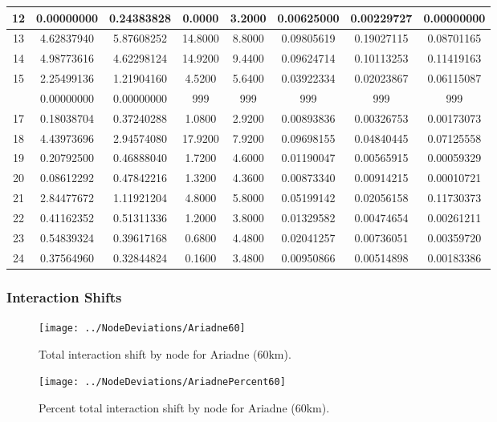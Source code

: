\documentclass[12pt,a4paper]{thesis}
\begin{document}
\begin{table}[H]
\begin{tabular}{|c|c|c|c|c|c|c|c|}
\hline	12	&	0.00000000	&	0.24383828	&	0.0000	&	3.2000	&	0.00625000	&	0.00229727	&	0.00000000	\\
\hline	13	&	4.62837940	&	5.87608252	&	14.8000	&	8.8000	&	0.09805619	&	0.19027115	&	0.08701165	\\
\hline	14	&	4.98773616	&	4.62298124	&	14.9200	&	9.4400	&	0.09624714	&	0.10113253	&	0.11419163	\\
\hline	15	&	2.25499136	&	1.21904160	&	4.5200	&	5.6400	&	0.03922334	&	0.02023867	&	0.06115087	\\
\rowcolor{yellow}
\hline	16	&	0.00000000	&	0.00000000	&	999	&	999	&	999	&	999	&	999	\\
\hline	17	&	0.18038704	&	0.37240288	&	1.0800	&	2.9200	&	0.00893836	&	0.00326753	&	0.00173073	\\
\hline	18	&	4.43973696	&	2.94574080	&	17.9200	&	7.9200	&	0.09698155	&	0.04840445	&	0.07125558	\\
\hline	19	&	0.20792500	&	0.46888040	&	1.7200	&	4.6000	&	0.01190047	&	0.00565915	&	0.00059329	\\
\hline	20	&	0.08612292	&	0.47842216	&	1.3200	&	4.3600	&	0.00873340	&	0.00914215	&	0.00010721	\\
\hline	21	&	2.84477672	&	1.11921204	&	4.8000	&	5.8000	&	0.05199142	&	0.02056158	&	0.11730373	\\
\hline	22	&	0.41162352	&	0.51311336	&	1.2000	&	3.8000	&	0.01329582	&	0.00474654	&	0.00261211	\\
\hline	23	&	0.54839324	&	0.39617168	&	0.6800	&	4.4800	&	0.02041257	&	0.00736051	&	0.00359720	\\
\hline	24	&	0.37564960	&	0.32844824	&	0.1600	&	3.4800	&	0.00950866	&	0.00514898	&	0.00183386	\\
\hline 
\end{tabular} 
\label{tab:ariadneNodeAfter100}
\end{table}

\subsubsection{Interaction Shifts}

\begin{figure}[H]
\centering
\texttt{[image: ../NodeDeviations/Ariadne60]}
\caption{Total interaction shift by node for Ariadne (60km).}
\label{fig:Ariadne60}
\end{figure}

\begin{figure}[H]
\centering
\texttt{[image: ../NodeDeviations/AriadnePercent60]}
\caption{Percent total interaction shift by node for Ariadne (60km).}
\label{fig:AriadnePercent60}
\end{figure}
\end{document}
